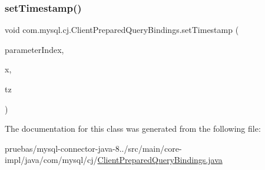 \mbox{\label{classcom_1_1mysql_1_1cj_1_1_client_prepared_query_bindings_a573aab742b0113b3eb75cce88952ffb4}} 
\subsubsection{\texorpdfstring{set\+Timestamp()}{setTimestamp()}\hspace{0.1cm}{\footnotesize\ttfamily [3/3]}}
{\footnotesize\ttfamily void com.\+mysql.\+cj.\+Client\+Prepared\+Query\+Bindings.\+set\+Timestamp (\begin{DoxyParamCaption}\item[{int}]{parameter\+Index,  }\item[{Timestamp}]{x,  }\item[{Time\+Zone}]{tz }\end{DoxyParamCaption})}



The documentation for this class was generated from the following file\+:\begin{DoxyCompactItemize}
\item 
pruebas/mysql-\/connector-\/java-\/8../src/main/core-\/impl/java/com/mysql/cj/\mbox{\hyperlink{_client_prepared_query_bindings_8java}{Client\+Prepared\+Query\+Bindings.\+java}}\end{DoxyCompactItemize}
